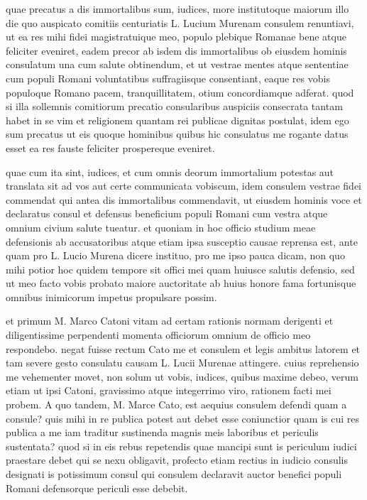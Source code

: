 
 quae precatus a dis immortalibus sum, iudices, more institutoque maiorum illo die quo auspicato comitiis centuriatis L. Lucium Murenam consulem renuntiavi, ut ea res mihi fidei magistratuique meo, populo plebique Romanae bene atque feliciter eveniret, eadem precor ab isdem dis immortalibus ob eiusdem hominis consulatum una cum salute obtinendum, et ut vestrae mentes atque sententiae cum populi Romani voluntatibus suffragiisque consentiant, eaque res vobis populoque Romano pacem, tranquillitatem, otium concordiamque adferat. quod si illa sollemnis comitiorum precatio consularibus auspiciis consecrata tantam habet in se vim et religionem quantam rei publicae dignitas postulat, idem ego sum precatus ut eis quoque hominibus quibus hic consulatus me rogante datus esset ea res fauste feliciter prospereque eveniret.

 quae cum ita sint, iudices, et cum omnis deorum immortalium potestas aut translata sit ad vos aut certe communicata vobiscum, idem consulem vestrae fidei commendat qui antea dis immortalibus commendavit, ut eiusdem hominis voce et declaratus consul et defensus beneficium populi Romani cum vestra atque omnium civium salute tueatur. et quoniam in hoc officio studium meae defensionis ab accusatoribus atque etiam ipsa susceptio causae reprensa est, ante quam pro L. Lucio Murena dicere instituo, pro me ipso pauca dicam, non quo mihi potior hoc quidem tempore sit offici mei quam huiusce salutis defensio, sed ut meo facto vobis probato maiore auctoritate ab huius honore fama fortunisque omnibus inimicorum impetus propulsare possim.

 et primum M. Marco Catoni vitam ad certam rationis normam derigenti et diligentissime perpendenti momenta officiorum omnium de officio meo respondebo. negat fuisse rectum Cato me et consulem et legis ambitus latorem et tam severe gesto consulatu causam L. Lucii Murenae attingere. cuius reprehensio me vehementer movet, non solum ut vobis, iudices, quibus maxime debeo, verum etiam ut ipsi Catoni, gravissimo atque integerrimo viro, rationem facti mei probem. A quo tandem, M. Marce Cato, est aequius consulem defendi quam a consule? quis mihi in re publica potest aut debet esse coniunctior quam is cui res publica a me iam traditur sustinenda magnis meis laboribus et periculis sustentata? quod si in eis rebus repetendis quae mancipi sunt is periculum iudici praestare debet qui se nexu obligavit, profecto etiam rectius in iudicio consulis designati is potissimum consul qui consulem declaravit auctor benefici populi Romani defensorque periculi esse debebit.


